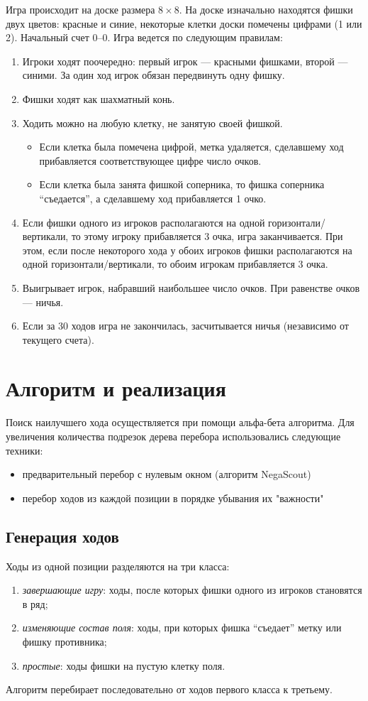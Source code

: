 \documentclass[a4paper]{article}
\begin{document}
Игра происходит на доске размера $8 \times 8$. На доске изначально находятся фишки двух цветов: красные и синие, некоторые клетки доски помечены цифрами (1 или 2). Начальный счет 0--0. Игра ведется по следующим правилам:
\begin{enumerate}
\item Игроки ходят поочередно: первый игрок --- красными фишками, второй --- синими. За один ход игрок обязан передвинуть одну фишку.
\item Фишки ходят как шахматный конь.
\item Ходить можно на любую клетку, не занятую своей фишкой.
	\begin{itemize}
	\item Если клетка была помечена цифрой, метка удаляется, сделавшему ход прибавляется соответствующее цифре число очков.
	\item Если клетка была занята фишкой соперника, то фишка соперника ``съедается'', а сделавшему ход прибавляется 1 очко.
	\end{itemize}
\item Если фишки одного из игроков располагаются на одной горизонтали/вертикали, то этому игроку прибавляется 3 очка, игра заканчивается. При этом, если после некоторого хода у обоих игроков фишки располагаются на одной горизонтали/вертикали, то обоим игрокам прибавляется 3 очка.
\item Выигрывает игрок, набравший наибольшее число очков. При равенстве очков --- ничья.
\item Если за 30 ходов игра не закончилась, засчитывается ничья (независимо от текущего счета).
\end{enumerate}

\section{Алгоритм и реализация}

Поиск наилучшего хода осуществляется при помощи альфа-бета алгоритма. Для увеличения количества подрезок дерева перебора использовались следующие техники:
\begin{itemize}
\item предварительный перебор с нулевым окном (алгоритм NegaScout)
\item перебор ходов из каждой позиции в порядке убывания их "важности"
\end{itemize}

\subsection{Генерация ходов}
Ходы из одной позиции разделяются на три класса:
\begin{enumerate}
\item {\itshape завершающие игру}: ходы, после которых фишки одного из игроков становятся в ряд;
\item {\itshape изменяющие состав поля}: ходы, при которых фишка ``съедает'' метку или фишку противника;
\item {\itshape простые}: ходы фишки на пустую клетку поля.
\end{enumerate}
Алгоритм перебирает последовательно от ходов первого класса к третьему. 
\end{document}
